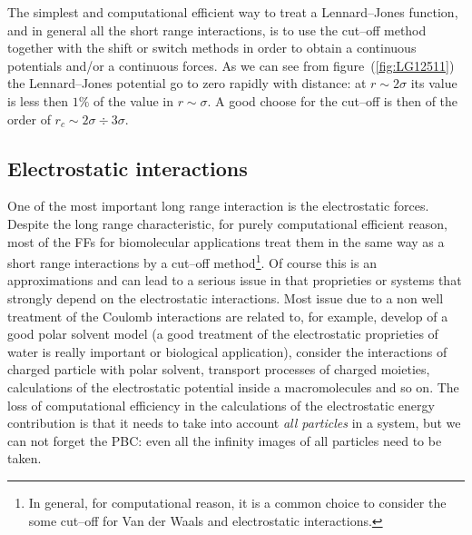 The simplest and computational efficient way to treat a Lennard--Jones function, and in general all the short range interactions, is to use the cut--off method together with the shift or switch methods in order to obtain a continuous potentials and/or a continuous forces. As we can see from figure~(\ref{fig:LG12511}) the Lennard--Jones potential go to zero rapidly with distance: at $r \sim 2\sigma$ its value is less then $1\%$ of the value in $r \sim \sigma$. A good choose for the cut--off is then of the order of $r_c \sim 2\sigma \div 3\sigma$.

\subsection{Electrostatic interactions}
\label{sec:longRangeInt}
One of the most important long range interaction is the electrostatic forces. Despite the long range characteristic, for purely computational efficient reason, most of the \acp{FF} for biomolecular applications treat them in the same way as a short range interactions by a cut--off method\footnote{In general, for computational reason, it is a common choice to consider the some cut--off for Van der Waals and electrostatic interactions.}. Of course this is an approximations and can lead to a serious issue in that proprieties or systems that strongly depend on the electrostatic interactions. Most issue due to a non well treatment of the Coulomb interactions are related to, for example, develop of a good polar solvent model (a good treatment of the electrostatic proprieties of water is really important or biological application), consider the interactions of charged particle with polar solvent, transport processes of charged moieties, calculations of the electrostatic potential inside a macromolecules and so on. The loss of computational efficiency in the calculations of the electrostatic energy contribution is that it needs to take into account \textit{all particles} in a system, but we can not forget the \ac{PBC}: even all the infinity images of all particles need to be taken.

